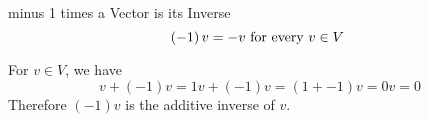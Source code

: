 \documentclass{standalone}
\begin{document}
\begin{theo*}{minus 1 times a Vector is its Inverse}
  \[
  \left( -1 \right) v =   - v \text{ for every $ v \in V$  } 
  \]
  \begin{pf}
    For $  v \in V$, we have
    \[
    v  +  \left( -1 \right)v =  1v  +  \left( -1 \right)v =  \left( 1  +  -1 \right)v =  0v =  0
    \]
    Therefore $ \left( -1 \right)v$ is the additive inverse of $ v$. 
  \end{pf}
\end{theo*}
\end{document}
